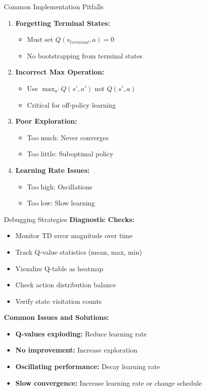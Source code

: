 \documentclass[aspectratio=169,10pt]{beamer}
\begin{document}
\begin{frame}{Common Implementation Pitfalls}
\begin{enumerate}
    \item \textbf{Forgetting Terminal States:}
    \begin{itemize}
        \item Must set $Q(s_{terminal}, a) = 0$
        \item No bootstrapping from terminal states
    \end{itemize}
    
    \item \textbf{Incorrect Max Operation:}
    \begin{itemize}
        \item Use $\max_{a'} Q(s', a')$ not $Q(s', a)$
        \item Critical for off-policy learning
    \end{itemize}
    
    \item \textbf{Poor Exploration:}
    \begin{itemize}
        \item Too much: Never converges
        \item Too little: Suboptimal policy
    \end{itemize}
    
    \item \textbf{Learning Rate Issues:}
    \begin{itemize}
        \item Too high: Oscillations
        \item Too low: Slow learning
    \end{itemize}
\end{enumerate}
\end{frame}

\begin{frame}{Debugging Strategies}
\textbf{Diagnostic Checks:}
\begin{itemize}
    \item Monitor TD error magnitude over time
    \item Track Q-value statistics (mean, max, min)
    \item Visualize Q-table as heatmap
    \item Check action distribution balance
    \item Verify state visitation counts
\end{itemize}

\textbf{Common Issues and Solutions:}
\begin{itemize}
    \item \textbf{Q-values exploding:} Reduce learning rate
    \item \textbf{No improvement:} Increase exploration
    \item \textbf{Oscillating performance:} Decay learning rate
    \item \textbf{Slow convergence:} Increase learning rate or change schedule
\end{itemize}
\end{frame}
\end{document}
